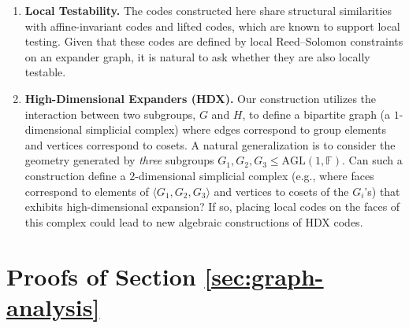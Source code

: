 \documentclass[11pt]{article}
\theoremstyle{plain}
\theoremstyle{definition}
\begin{document}
\begin{enumerate}
    \item \textbf{Local Testability.}
    The codes constructed here share structural similarities with affine-invariant codes and lifted codes, which are known to support local testing. Given that these codes are defined by local Reed--Solomon constraints on an expander graph, it is natural to ask whether they are also locally testable. 

    \item \textbf{High-Dimensional Expanders (HDX).}
    Our construction utilizes the interaction between two subgroups, $G$ and $H$, to define a bipartite graph (a $1$-dimensional simplicial complex) where edges correspond to group elements and vertices correspond to cosets. A natural generalization is to consider the geometry generated by \emph{three} subgroups $G_1, G_2, G_3 \le \mathrm{AGL}(1, \mathbb{F})$. Can such a construction define a $2$-dimensional simplicial complex (e.g., where faces correspond to elements of $\langle G_1,G_2,G_3\rangle$ and vertices to cosets of the $G_i$'s) that exhibits high-dimensional expansion? If so, placing local codes on the faces of this complex could lead to new algebraic constructions of HDX codes.
\end{enumerate}


\appendix
\section{Proofs of Section \ref{sec:graph-analysis}}
\label{proofs-section-3}
\end{document}
